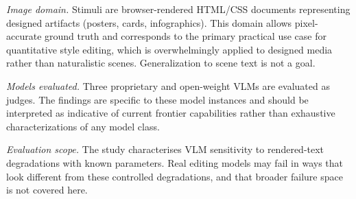 \textit{Image domain.} Stimuli are browser-rendered HTML/CSS documents representing designed artifacts (posters, cards, infographics). This domain allows pixel-accurate ground truth and corresponds to the primary practical use case for quantitative style editing, which is overwhelmingly applied to designed media rather than naturalistic scenes. Generalization to scene text is not a goal.

\textit{Models evaluated.} Three proprietary and open-weight VLMs are evaluated as judges. The findings are specific to these model instances and should be interpreted as indicative of current frontier capabilities rather than exhaustive characterizations of any model class.

\textit{Evaluation scope.} The study characterises VLM sensitivity to rendered-text degradations with known parameters. Real editing models may fail in ways that look different from these controlled degradations, and that broader failure space is not covered here.